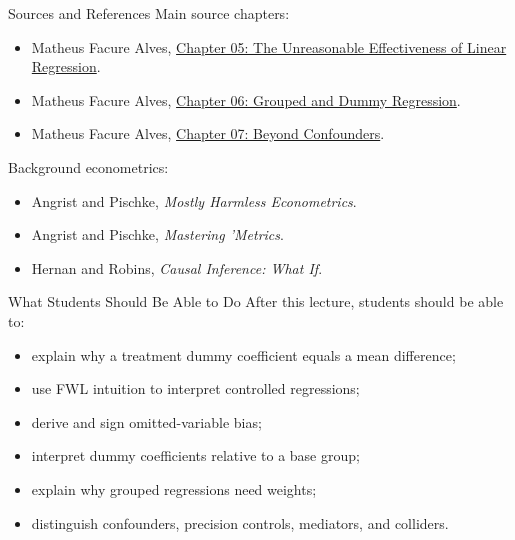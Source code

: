 \documentclass[11pt,aspectratio=169]{beamer}
\begin{document}
\begin{frame}{Sources and References}
  Main source chapters:
  \begin{itemize}
    \item Matheus Facure Alves, \href{https://matheusfacure.github.io/python-causality-handbook/05-The-Unreasonable-Effectiveness-of-Linear-Regression.html}{Chapter 05: The Unreasonable Effectiveness of Linear Regression}.
    \item Matheus Facure Alves, \href{https://matheusfacure.github.io/python-causality-handbook/06-Grouped-and-Dummy-Regression.html}{Chapter 06: Grouped and Dummy Regression}.
    \item Matheus Facure Alves, \href{https://matheusfacure.github.io/python-causality-handbook/07-Beyond-Confounders.html}{Chapter 07: Beyond Confounders}.
  \end{itemize}
  Background econometrics:
  \begin{itemize}
    \item Angrist and Pischke, \emph{Mostly Harmless Econometrics}.
    \item Angrist and Pischke, \emph{Mastering 'Metrics}.
    \item Hernan and Robins, \emph{Causal Inference: What If}.
  \end{itemize}
\end{frame}

\begin{frame}{What Students Should Be Able to Do}
  After this lecture, students should be able to:
  \begin{itemize}
    \item explain why a treatment dummy coefficient equals a mean difference;
    \item use FWL intuition to interpret controlled regressions;
    \item derive and sign omitted-variable bias;
    \item interpret dummy coefficients relative to a base group;
    \item explain why grouped regressions need weights;
    \item distinguish confounders, precision controls, mediators, and colliders.
  \end{itemize}
\end{frame}

\appendix
\end{document}
